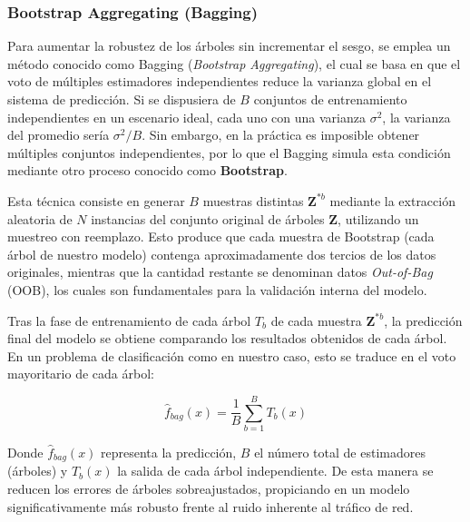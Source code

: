\documentclass[12pt]{article}
\numberwithin{equation}{section} %
\begin{document}
    \subsubsection{Bootstrap Aggregating (Bagging)}

    \vspace{5mm}

    Para aumentar la robustez de los árboles sin incrementar el sesgo, se emplea un método conocido como Bagging (\textit{Bootstrap Aggregating}), el cual se basa en que el voto de múltiples estimadores independientes reduce la varianza global en el sistema de predicción. Si se dispusiera de $B$ conjuntos de entrenamiento independientes en un escenario ideal, cada uno con una varianza $\sigma^2$, la varianza del promedio sería $\sigma^2/B$. Sin embargo, en la práctica es imposible obtener múltiples conjuntos independientes, por lo que el Bagging simula esta condición mediante otro proceso conocido como \textbf{Bootstrap}.

    \vspace{5mm}

    Esta técnica consiste en generar $B$ muestras distintas $\mathbf{Z}^{*b}$ mediante la extracción aleatoria de $N$ instancias del conjunto original de árboles $\mathbf{Z}$, utilizando un muestreo con reemplazo. Esto produce que cada muestra de Bootstrap (cada árbol de nuestro modelo) contenga aproximadamente dos tercios de los datos originales, mientras que la cantidad restante se denominan datos \textit{Out-of-Bag} (OOB), los cuales son fundamentales para la validación interna del modelo.

    \vspace{5mm}

    Tras la fase de entrenamiento de cada árbol $T_b$ de cada muestra $\mathbf{Z}^{*b}$, la predicción final del modelo se obtiene comparando los resultados obtenidos de cada árbol. En un problema de clasificación como en nuestro caso, esto se traduce en el voto mayoritario de cada árbol:

    \vspace{2.5mm}

    \begin{equation}
    \hat{f}_{bag}(x) = \frac{1}{B} \sum_{b=1}^{B} T_b(x)
    \end{equation}

    \vspace{2.5mm}

    Donde $\hat{f}_{bag}(x)$ representa la predicción, $B$ el número total de estimadores (árboles) y $T_b(x)$ la salida de cada árbol independiente. De esta manera se reducen los errores de árboles sobreajustados, propiciando en un modelo significativamente más robusto frente al ruido inherente al tráfico de red.
\end{document}
